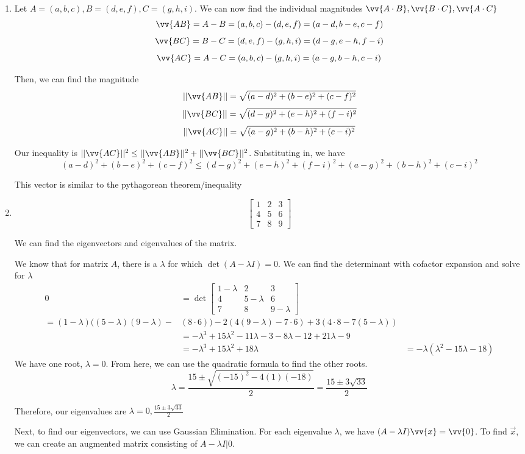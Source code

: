\documentclass[11pt, letterpaper, twoside]{article}
\begin{document}
\begin{enumerate}
\item Let \(A=(a, b, c), B=(d, e, f), C=(g, h, i)\).
We can now find the individual magnitudes \(\vv{A\cdot B}, \vv {B\cdot C}, \vv {A\cdot C}\)
\[\vv{AB}=A-B=(a,b,c)-(d,e,f)=(a-d, b-e, c-f)\]
\[\vv{BC}=B-C=(d,e,f)-(g,h,i)=(d-g,e-h,f-i)\]
\[\vv{AC}=A-C=(a,b,c)-(g,h,i)=(a-g,b-h,c-i)\]

Then, we can find the magnitude 
\[||\vv{AB}|| = \sqrt{(a-d)^2+(b-e)^2+(c-f)^2}\]
\[||\vv{BC}|| = \sqrt{(d-g)^2+(e-h)^2+(f-i)^2}\]
\[||\vv{AC}|| = \sqrt{(a-g)^2+(b-h)^2+(c-i)^2}\]

Our inequality is \(||\vv{AC}||^2\leq ||\vv{AB}||^2+||\vv{BC}||^2\). Substituting in, we have 
\[(a-d)^2+(b-e)^2+(c-f)^2\leq(d-g)^2+(e-h)^2+(f-i)^2+(a-g)^2+(b-h)^2+(c-i)^2\]

This vector is similar to the pythagorean theorem/inequality
\item 
\[\begin{bmatrix}
    1&2&3\\
    4&5&6\\
    7&8&9
\end{bmatrix}\]

We can find the eigenvectors and eigenvalues of the matrix.

We know that for matrix \(A\), there is a \(\lambda\) for which \(\det (A-\lambda I)=0\).
We can find the determinant with cofactor expansion and solve for \(\lambda\)
\begin{align*}
0&=\det \begin{bmatrix}
    1-\lambda&2&3\\
    4&5-\lambda&6\\
    7&8&9-\lambda
\end{bmatrix}\\
=(1-\lambda)((5-\lambda)(9-\lambda)-&(8\cdot 6))-2(4(9-\lambda)-7\cdot6)+3(4\cdot8-7(5-\lambda))\\
&=-\lambda^3+15\lambda^2-11\lambda-3-8\lambda-12+21\lambda-9\\
&=-\lambda^3+15\lambda^2+18\lambda
&=-\lambda(\lambda^2-15\lambda-18)
\end{align*}
We have one root, \(\lambda=0\). 
From here, we can use the quadratic formula to find the other roots.
\[\lambda=\frac{15\pm\sqrt{(-15)^2-4(1)(-18)}}{2}=\frac{15\pm3\sqrt{33}}{2}\]

Therefore, our eigenvalues are \(\lambda=0, \frac{15\pm3\sqrt{33}}{2}\)

Next, to find our eigenvectors, we can use Gaussian Elimination. 
For each eigenvalue \(\lambda\), we have \((A-\lambda I)\vv{x}=\vv{0}\).
To find \(\vec x\), we can create an augmented matrix consisting of \(A-\lambda I | 0\).


\end{enumerate}
\end{document}
